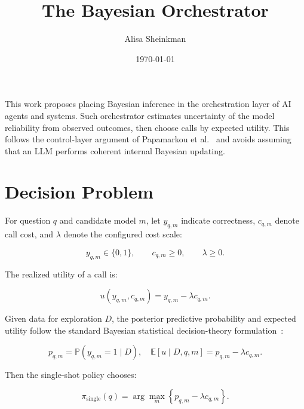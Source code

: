 \documentclass[11pt]{article}
\title{The Bayesian Orchestrator}
\author{Alisa Sheinkman}
\date{\today}
\begin{document}
\maketitle

This work proposes placing Bayesian inference in the orchestration layer of AI agents and systems. Such orchestrator estimates uncertainty of the model reliability from observed outcomes, then choose calls by expected utility.
This follows the control-layer argument of Papamarkou et al.~\citep{papamarkou2026bayesconsistent} and avoids assuming that an LLM performs coherent internal Bayesian updating.





\section{Decision Problem}

For question $q$ and candidate model $m$, let $y_{q,m}$ indicate correctness, $c_{q,m}$ denote call cost, and $\lambda$ denote the configured cost scale:

\begin{equation*}
y_{q,m}\in\{0,1\},
\qquad
c_{q,m}\ge 0,
\qquad
\lambda\ge 0.
\end{equation*}

The realized utility of a call is:

\begin{equation*}
u(y_{q,m},c_{q,m})=y_{q,m}-\lambda c_{q,m}.
\end{equation*}

Given data for exploration $D$, the posterior predictive probability and expected utility follow the standard Bayesian statistical decision-theory formulation~\citep{berger1985statistical}:

\begin{equation*}
p_{q,m}=\mathbb{P}(y_{q,m}=1\mid D), \quad
\mathbb{E}[u\mid D,q,m]=p_{q,m}-\lambda c_{q,m}.
\end{equation*}

Then the single-shot policy chooses:

\begin{equation*}
\pi_{\mathrm{single}}(q)
=
\arg\max_m\left\{p_{q,m}-\lambda c_{q,m}\right\}.
\end{equation*}
\end{document}
